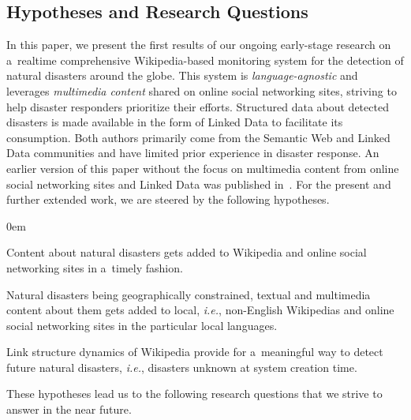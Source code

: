 \documentclass[letterpaper]{article}
\begin{document}
\subsection{Hypotheses and Research Questions}

In this paper, we present the first results of
our ongoing early-stage research
on a~realtime comprehensive Wikipedia-based monitoring system
for the detection of natural disasters around the globe.
This system is \emph{language-agnostic} and leverages
\emph{multimedia content} shared on online social networking sites,
striving to help disaster responders prioritize their efforts.
Structured data about detected disasters is made available
in the form of Linked Data to facilitate its consumption.
Both authors primarily come from the Semantic Web
and Linked Data communities
and have limited prior experience in disaster response.
An earlier version of this paper without the focus
on multimedia content from online social networking sites and Linked Data
was published in~\cite{steiner2014disaster}.
For the present and further extended work, we are steered by the following hypotheses.

\begin{description}
  \itemsep0em
  \item[$\mathbb{H}1$] Content about natural disasters
    gets added to Wikipedia and online social networking sites in a~timely fashion.
  \item[$\mathbb{H}2$] Natural disasters being geographically
    constrained, textual and multimedia content about them
    gets added to local, \emph{i.e.}, non-English Wikipedias
    and online social networking sites
    in the particular local languages.
  \item[$\mathbb{H}3$] Link structure dynamics of Wikipedia
    provide for a~meaningful way to detect future
    natural disasters, \emph{i.e.}, disasters unknown at system creation time.
\end{description}

\noindent These hypotheses lead us to the following research questions
that we strive to answer in the near future.
\end{document}
